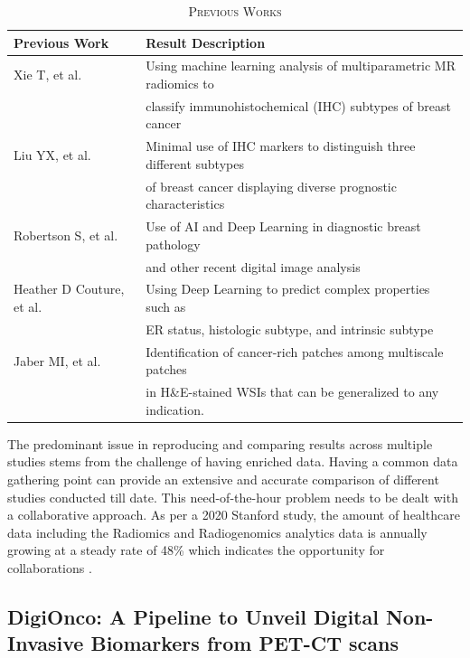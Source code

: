 \documentclass[final,1p,times,twocolumn]{elsarticle}
\begin{document}
\begin{table}[htbp]
\caption{\textsc{Previous Works}}
\label{table:pw}
\centering
\scalebox{0.8}
{
\begin{tabular}{| l | l |}
\hline
{\textbf{Previous Work}} & {\textbf{Result Description}}\\
\hline
{Xie T, et al. \cite{7}} & {Using machine learning analysis of multiparametric MR radiomics to }\\
{}&{classify immunohistochemical (IHC) subtypes of breast cancer}\\
\hline
{Liu YX, et al. \cite{5}}&{Minimal use of IHC markers to distinguish three different subtypes}\\
{}&{of breast cancer displaying diverse prognostic characteristics}\\
\hline
{Robertson S, et al. \cite{d}}&{Use of AI and Deep Learning in diagnostic breast pathology}\\
{}&{and other recent digital image analysis}\\
\hline
{Heather D Couture, et al. \cite{1}}&{Using Deep Learning to predict complex properties such as }\\
{}&{ER status, histologic subtype, and intrinsic subtype}\\
\hline
{Jaber MI, et al. \cite{e}}&{Identification of cancer-rich patches among multiscale patches}\\
{}&{in H\&E-stained WSIs that can be generalized to any indication.}\\
\hline
\end{tabular}
}
\end{table}


The predominant issue in reproducing and comparing results across multiple studies stems from the challenge of having enriched data. Having a common data gathering point can provide an extensive and accurate comparison of different studies conducted till date. This need-of-the-hour problem needs to be dealt with a collaborative approach. As per a 2020 Stanford study, the amount of healthcare data including the Radiomics and Radiogenomics analytics data is annually growing at a steady rate of 48\% which indicates the opportunity for collaborations \cite{10}. 

\subsection{DigiOnco: A Pipeline to Unveil Digital Non-Invasive Biomarkers from PET-CT scans}
\end{document}
